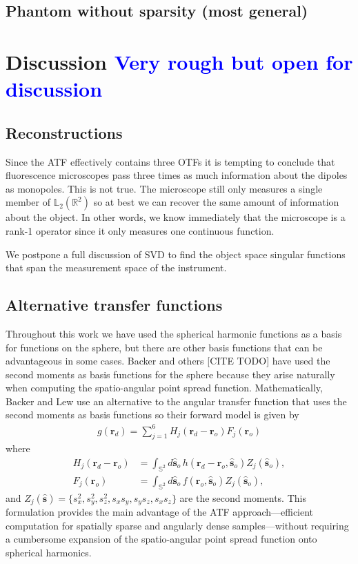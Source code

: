 \documentclass{osa-article}
\providecommand{\ro}{\mathbf{\mathbf{r}}_o}
\providecommand{\so}{\mathbf{\hat{s}}_o}
\providecommand{\rd}{\mathbf{r}_d}
\providecommand{\mh}[1]{\mathbf{\hat{#1}}}
\providecommand{\mbb}[1]{\mathbb{#1}}
\providecommand{\tb}[1]{\textcolor{blue}{#1}}
\begin{document}
\subsection{Phantom without sparsity (most general)} 

\section{Discussion \tb{Very rough but open for discussion}}
\subsection{Reconstructions}
Since the ATF effectively contains three OTFs it is tempting to conclude that
fluorescence microscopes pass three times as much information about the dipoles
as monopoles. This is not true. The microscope still only measures a single
member of $\mbb{L}_2(\mbb{R}^2)$ so at best we can recover the same amount of
information about the object. In other words, we know immediately that the
microscope is a rank-1 operator since it only measures one continuous function.

We postpone a full discussion of SVD to find the object space singular functions
that span the measurement space of the instrument.

\subsection{Alternative transfer functions}
Throughout this work we have used the spherical harmonic functions as a basis
for functions on the sphere, but there are other basis functions that can be
advantageous in some cases. Backer and others [CITE TODO] have used the second
moments as basis functions for the sphere because they arise naturally when
computing the spatio-angular point spread function. Mathematically, Backer and
Lew use an alternative to the angular transfer function that uses the second
moments as basis functions so their forward model is given by
\begin{align}
  g(\rd) = \sum_{j=1}^6 H_j(\rd - \ro)F_j(\ro)
\end{align}
where
\begin{align}
  H_j(\rd - \ro) &= \int_{\mbb{S}^2}d\so\, h(\rd - \ro, \so)Z_j(\so),\\
  F_j(\ro) &= \int_{\mbb{S}^2}d\so\, f(\ro, \so)Z_j(\so),
\end{align}
and $Z_j(\mh{s}) = \{s_x^2, s_y^2, s_z^2, s_xs_y, s_ys_z, s_xs_z\}$ are the
second moments. This formulation provides the main advantage of the ATF
approach---efficient computation for spatially sparse and angularly dense
samples---without requiring a cumbersome expansion of the spatio-angular point
spread function onto spherical harmonics.
\end{document}
